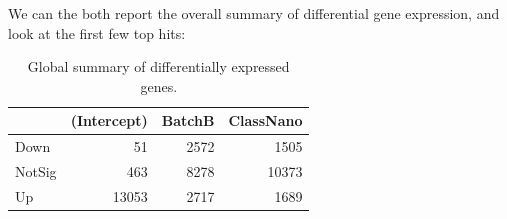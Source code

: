 \documentclass[9pt,a4paper,]{extarticle}
\newenvironment{Shaded}{\begin{snugshade}}{\end{snugshade}}
\newcommand{\KeywordTok}[1]{\textcolor[rgb]{0.13,0.29,0.53}{\textbf{{#1}}}}
\newcommand{\DataTypeTok}[1]{\textcolor[rgb]{0.13,0.29,0.53}{{#1}}}
\newcommand{\StringTok}[1]{\textcolor[rgb]{0.31,0.60,0.02}{{#1}}}
\newcommand{\CommentTok}[1]{\textcolor[rgb]{0.56,0.35,0.01}{\textit{{#1}}}}
\newcommand{\NormalTok}[1]{{#1}}
\begin{document}
We can the both report the overall summary of differential gene expression, and look at the first few top hits:

\begin{Shaded}
\end{Shaded}

\begin{table}[t]

\caption{\label{tab:limmaSummary}Global summary of differentially expressed genes.}
\centering
\begin{tabular}{l|r|r|r}
\hline
  & (Intercept) & BatchB & ClassNano\\
\hline
Down & 51 & 2572 & 1505\\
\hline
NotSig & 463 & 8278 & 10373\\
\hline
Up & 13053 & 2717 & 1689\\
\hline
\end{tabular}
\end{table}

\begin{Shaded}
\end{Shaded}
\end{document}
